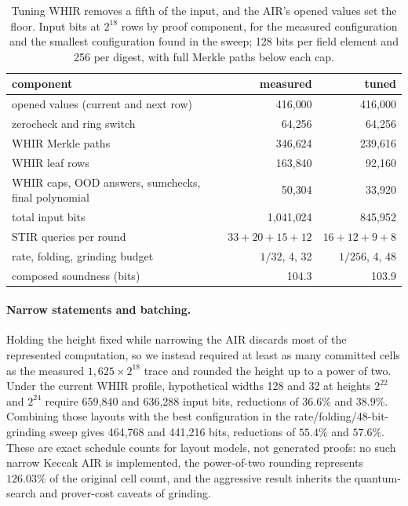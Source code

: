 \documentclass[11pt]{article}
\begin{document}
\begin{table}[t]\centering\small
\begin{tabular}{lrr}\toprule
component & measured & tuned\\\midrule
opened values (current and next row) & 416{,}000 & 416{,}000\\
zerocheck and ring switch & 64{,}256 & 64{,}256\\
WHIR Merkle paths & 346{,}624 & 239{,}616\\
WHIR leaf rows & 163{,}840 & 92{,}160\\
WHIR caps, OOD answers, sumchecks, final polynomial & 50{,}304 & 33{,}920\\\midrule
total input bits & 1{,}041{,}024 & 845{,}952\\
STIR queries per round & $33+20+15+12$ & $16+12+9+8$\\
rate, folding, grinding budget & $1/32$, 4, 32 & $1/256$, 4, 48\\
composed soundness (bits) & 104.3 & 103.9\\\bottomrule
\end{tabular}
\caption{Tuning WHIR removes a fifth of the input, and the AIR's opened values set
the floor. Input bits at $2^{18}$ rows by proof component, for the measured
configuration and the smallest configuration found in the sweep; 128 bits per field element and 256
per digest, with full Merkle paths below each cap.}
\label{tab:inputs}
\end{table}

\paragraph{Narrow statements and batching.} Holding the height fixed while
narrowing the AIR discards most of the represented computation, so we instead
required at least as many committed cells as the measured
$1{,}625\mathbin{\times}2^{18}$ trace and rounded the height up to a power of two.
Under the current WHIR profile, hypothetical widths 128 and 32 at heights
$2^{22}$ and $2^{24}$ require 659{,}840 and 636{,}288 input bits, reductions of
$36.6\%$ and $38.9\%$. Combining those layouts with the best configuration in
the rate/folding/48-bit-grinding sweep gives 464{,}768 and 441{,}216 bits,
reductions of $55.4\%$ and $57.6\%$. These are exact schedule counts for layout
models, not generated proofs: no such narrow Keccak AIR is implemented, the
power-of-two rounding represents $126.03\%$ of the original cell count, and the
aggressive result inherits the quantum-search and prover-cost caveats of
grinding.
\end{document}
